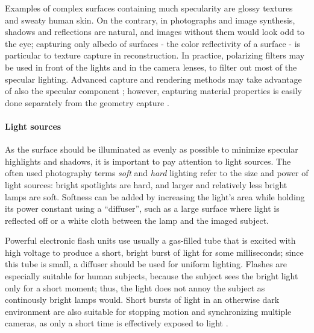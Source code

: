 Examples of complex surfaces containing much specularity are glossy textures and sweaty human skin.
On the contrary, in photographs and image synthesis, shadows and reflections are natural, and images without them would look odd to the eye; capturing only albedo of surfaces - the color reflectivity of a surface - is particular to texture capture in reconstruction.
In practice, polarizing filters may be used in front of the lights and in the camera lenses, to filter out most of the specular lighting.
Advanced capture and rendering methods may take advantage of also the specular component \cite{ghosh2011multiview}; however, capturing material properties is easily done separately from the geometry capture \cite{aittala2013practical}.


\paragraph{Light sources}
As the surface should be illuminated as evenly as possible to minimize specular highlights and shadows, it is important to pay attention to light sources.
The often used photography terms \emph{soft} and \emph{hard} lighting refer to the size and power of light sources: bright spotlights are hard, and larger and relatively less bright lamps are soft.
Softness can be added by increasing the light's area while holding its power constant using a ``diffuser'', such as a large surface where light is reflected off or a white cloth between the lamp and the imaged subject.
\cite[p. 108]{langford2000basic}

Powerful electronic flash units use usually a gas-filled tube that is excited with high voltage to produce a short, bright burst of light for some milliseconds;
since this tube is small, a diffuser should be used for uniform lighting.
Flashes are especially suitable for human subjects, because the subject sees the bright light only for a short moment; thus, the light does not annoy the subject as continously bright lamps would.
Short bursts of light in an otherwise dark environment are also suitable for stopping motion and synchronizing multiple cameras, as only a short time is effectively exposed to light \cite{langford2000basic}.

